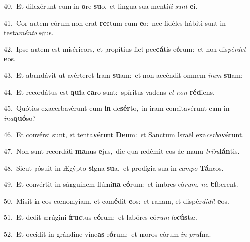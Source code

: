 {\numbfont\textcolor{\numbcolor}{40.}}~Et dilexérunt eum in \textbf{o}\-re \textbf{su}\-o,~\star et lingua sua mentí\textit{ti} \textit{sunt} \textbf{e}\-i.\par
{\numbfont\textcolor{\numbcolor}{41.}}~Cor autem eórum non erat \textbf{rec}\-tum cum \textbf{e}\-o:~\star nec fidéles hábiti sunt in testa\-\textit{mén}\-\textit{to} \textbf{e}\-jus.\par
{\numbfont\textcolor{\numbcolor}{42.}}~Ipse autem est miséricors, et propítius fiet pec\-\textbf{cá}\-tis e\-\textbf{ó}\-rum:~\star et non dis\-\textit{pér}\-\textit{det} \textbf{e}\-os.\par
{\numbfont\textcolor{\numbcolor}{43.}}~Et abundávit ut avérteret \textbf{i}\-ram \textbf{su}\-am:~\star et non accéndit omnem \textit{i}\-\textit{ram} \textbf{su}\-am:\par
{\numbfont\textcolor{\numbcolor}{44.}}~Et recordátus est \textbf{qui}\-a \textbf{ca}\-ro sunt:~\star spíritus vadens \textit{et} \textit{non} \textbf{réd}\-iens.\par
{\numbfont\textcolor{\numbcolor}{45.}}~Quóties exacerbavérunt eum \textbf{in} de\-\textbf{sér}\-to,~\star in iram concitavérunt eum in \textit{in}\-\textit{a}\textbf{quó}so?\par
{\numbfont\textcolor{\numbcolor}{46.}}~Et convérsi sunt, et tenta\-\textbf{vé}\-runt \textbf{De}\-um:~\star et Sanctum Israël exa\-\textit{cer}\-\textit{ba}\textbf{vé}runt.\par
{\numbfont\textcolor{\numbcolor}{47.}}~Non sunt recordáti \textbf{ma}\-nus \textbf{e}\-jus,~\star die qua redémit eos de manu \textit{tri}\-\textit{bu}\textbf{lán}tis.\par
{\numbfont\textcolor{\numbcolor}{48.}}~Sicut pósuit in Ægýpto \textbf{si}\-gna \textbf{su}\-a,~\star et prodígia sua in \textit{cam}\-\textit{po} \textbf{Tá}\-neos.\par
{\numbfont\textcolor{\numbcolor}{49.}}~Et convértit in sánguinem flúmi\textbf{na} e\-\textbf{ó}\-rum:~\star et imbres eó\-\textit{rum}\-, \textit{ne} \textbf{bí}\-berent.\par
{\numbfont\textcolor{\numbcolor}{50.}}~Misit in eos cœnomyíam, et com\-\textbf{é}\-dit \textbf{e}\-os:~\star et ranam, et dispér\-\textit{di}\-\textit{dit} \textbf{e}\-os.\par
{\numbfont\textcolor{\numbcolor}{51.}}~Et dedit ærúgini \textbf{fruc}\-tus e\-\textbf{ó}\-rum:~\star et labóres eó\textit{rum} \textit{lo}\-\textbf{cús}tæ.\par
{\numbfont\textcolor{\numbcolor}{52.}}~Et occídit in grándine víne\textbf{as} e\-\textbf{ó}\-rum:~\star et moros eórum \textit{in} \textit{pru}\-\textbf{í}na.\par

